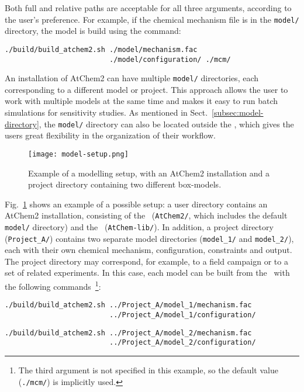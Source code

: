 Both full and relative paths are acceptable for all three arguments,
according to the user's preference. For example, if the chemical
mechanism file is in the \texttt{model/} directory, the model is build
using the command:

\begin{verbatim}
./build/build_atchem2.sh ./model/mechanism.fac
                         ./model/configuration/ ./mcm/
\end{verbatim}

An installation of AtChem2 can have multiple \texttt{model/}
directories, each corresponding to a different model or project. This
approach allows the user to work with multiple models at the same time
and makes it easy to run batch simulations for sensitivity studies. As
mentioned in Sect.~\ref{subsec:model-directory}, the \texttt{model/}
directory can also be located outside the \maindir, which gives the
users great flexibility in the organization of their workflow.

\begin{figure}[htb]
  \centering
  \texttt{[image: model-setup.png]}
  \caption{Example of a modelling setup, with an AtChem2 installation
    and a project directory containing two different box-models.}
  \label{fig:setup}
\end{figure}

Fig.~\ref{fig:setup} shows an example of a possible setup: a user
directory contains an AtChem2 installation, consisting of the
\maindir\ (\texttt{AtChem2/}, which includes the default
\texttt{model/} directory) and the \depdir\ (\texttt{AtChem-lib/}). In
addition, a project directory (\texttt{Project\_A/}) contains two
separate model directories (\texttt{model\_1/} and
\texttt{model\_2/}), each with their own chemical mechanism,
configuration, constraints and output. The project directory may
correspond, for example, to a field campaign or to a set of related
experiments. In this case, each model can be built from the \maindir\
with the following commands~\footnote{The third argument is not
  specified in this example, so the default value (\texttt{./mcm/}) is
  implicitly used.}:

\begin{verbatim}
./build/build_atchem2.sh ../Project_A/model_1/mechanism.fac
                         ../Project_A/model_1/configuration/
\end{verbatim}

\begin{verbatim}
./build/build_atchem2.sh ../Project_A/model_2/mechanism.fac
                         ../Project_A/model_2/configuration/
\end{verbatim}

